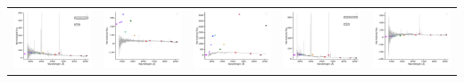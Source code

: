 \begin{center}
\begin{longtable}{l l l l l }
    \includegraphics[width=0.19\linewidth, clip]{Figs/Figs-lamost/spec-56741-HD115451S012705B_sp07-217-SPLUS-n03s23-001039.pdf} & \includegraphics[width=0.19\linewidth, clip]{Figs/Figs-lamost/spec-56741-HD115451S012705B_sp11-044-SPLUS-n02n22-000168.pdf} & \includegraphics[width=0.19\linewidth, clip]{Figs/Figs-lamost/spec-56741-HD115451S012705B_sp13-174-SPLUS-n02s22-039680.pdf} & \includegraphics[width=0.19\linewidth, clip]{Figs/Figs-lamost/spec-56741-HD115451S012705B_sp15-056-SPLUS-n01s21-007449.pdf} & \includegraphics[width=0.19\linewidth, clip]{Figs/Figs-lamost/spec-56749-HD123204S014620M01_sp16-101-SPLUS-n01s28-027608.pdf} \\

\end{longtable}
\end{center}

